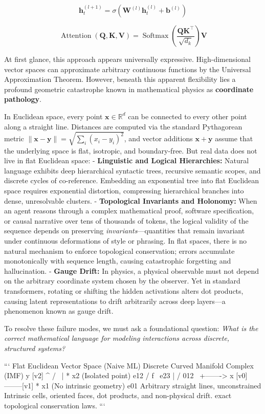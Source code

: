\documentclass[11pt,twoside,openright]{amsbook}
\begin{document}
$$\mathbf{h}_{t}^{(l+1)} = \sigma\left(\mathbf{W}^{(l)} \mathbf{h}_{t}^{(l)} + \mathbf{b}^{(l)}\right)$$

$$\operatorname{Attention}(\mathbf{Q}, \mathbf{K}, \mathbf{V}) = \operatorname{Softmax}\left(\frac{\mathbf{Q}\mathbf{K}^\top}{\sqrt{d_k}}\right) \mathbf{V}$$

At first glance, this approach appears universally expressive. High-dimensional vector spaces can approximate arbitrary continuous functions by the Universal Approximation Theorem. However, beneath this apparent flexibility lies a profound geometric catastrophe known in mathematical physics as \textbf{coordinate pathology}.

In Euclidean space, every point $\mathbf{x} \in \mathbb{R}^d$ can be connected to every other point along a straight line. Distances are computed via the standard Pythagorean metric $\|\mathbf{x} - \mathbf{y}\| = \sqrt{\sum_i (x_i - y_i)^2}$, and vector additions $\mathbf{x} + \mathbf{y}$ assume that the underlying space is flat, isotropic, and boundary-free. But real data does not live in flat Euclidean space:
- \textbf{Linguistic and Logical Hierarchies:} Natural language exhibits deep hierarchical syntactic trees, recursive semantic scopes, and discrete cycles of co-reference. Embedding an exponential tree into flat Euclidean space requires exponential distortion, compressing hierarchical branches into dense, unresolvable clusters.
- \textbf{Topological Invariants and Holonomy:} When an agent reasons through a complex mathematical proof, software specification, or causal narrative over tens of thousands of tokens, the logical validity of the sequence depends on preserving \textit{invariants}—quantities that remain invariant under continuous deformations of style or phrasing. In flat spaces, there is no natural mechanism to enforce topological conservation; errors accumulate monotonically with sequence length, causing catastrophic forgetting and hallucination.
- \textbf{Gauge Drift:} In physics, a physical observable must not depend on the arbitrary coordinate system chosen by the observer. Yet in standard transformers, rotating or shifting the hidden activations alters dot products, causing latent representations to drift arbitrarily across deep layers—a phenomenon known as gauge drift.

To resolve these failure modes, we must ask a foundational question: \textit{What is the correct mathematical language for modeling interactions across discrete, structured systems?}

```
Flat Euclidean Vector Space (Naive ML)           Discrete Curved Manifold Complex (IMF)
          y                                                     [v2]
          ^                                                    /    \
          |    * x2 (Isolated point)                      e12 /  f   \ e23
          |                                                  /  012   \
          +-------> x                                      [v0]--------[v1]
             * x1 (No intrinsic geometry)                         e01
     Arbitrary straight lines, unconstrained            Intrinsic cells, oriented faces,
     dot products, and non-physical drift.              exact topological conservation laws.
```
\end{document}
